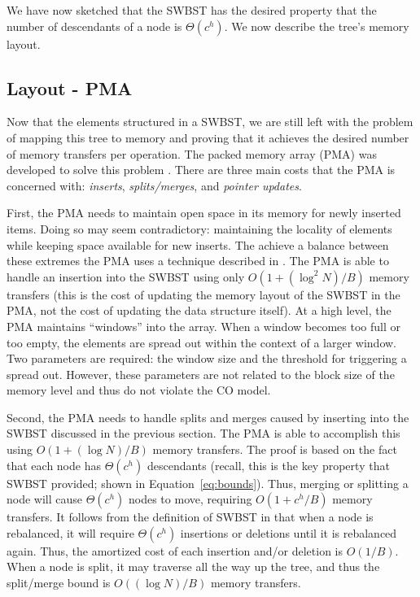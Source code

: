\documentclass[preprint]{style}
\begin{document}
We have now sketched that the SWBST has the desired property that the number of
descendants of a node is $\Theta(c^h)$. We now describe the tree's memory layout.

\subsection{Layout - PMA}
\label{sec:layout}

Now that the elements structured in a SWBST, we are still left with the problem
of mapping this tree to memory and proving that it achieves the desired number
of memory transfers per operation. The packed memory array (PMA) was developed
to solve this problem \cite{BenderDemainColton}. There are three main costs
that the PMA is concerned with: \textit{inserts}, \textit{splits/merges}, and
\textit{pointer updates}.

First, the PMA needs to maintain open space in its memory for newly inserted
items. Doing so may seem contradictory: maintaining the locality of elements
while keeping space available for new inserts. The achieve a balance between
these extremes the PMA uses a technique
described in \cite{packedmemoryarray}.
The PMA is able to handle an insertion into the SWBST using only $O(1 +
(\log^2{N}) / B)$ memory transfers (this is the cost of updating the memory
layout of the SWBST in the PMA, not the cost of updating the data structure
itself). At a high level, the PMA maintains
``windows'' into the array. When a window becomes too full or too empty, the
elements are spread out within the context of a larger window. Two parameters
are required: the window size and the threshold for triggering a spread out.
However, these parameters are not related to the block size of the memory level
and thus do not violate the CO model. 

Second, the PMA needs to handle splits and merges caused by inserting into the
SWBST discussed in the previous section. The PMA is able to accomplish this
using $O(1 + (\log{N}) /B)$ memory transfers. The proof is based on the fact
that each node has $\Theta(c^h)$ descendants (recall, this is the key property
that SWBST provided; shown in Equation~\ref{eq:bounds}). Thus, merging or splitting a node will cause
$\Theta(c^h)$ nodes to move, requiring $O(1 + c^h/B)$ memory transfers. It
follows from the definition of SWBST in \cite{swbst} that when a node is
rebalanced, it will require $\Theta(c^h)$ insertions or deletions until it is
rebalanced again. Thus, the amortized cost of each insertion and/or deletion is
$O(1/B)$. When a node is split, it may traverse all the way up the tree, and
thus the split/merge bound is $O((\log N) / B)$ memory transfers.
\end{document}
